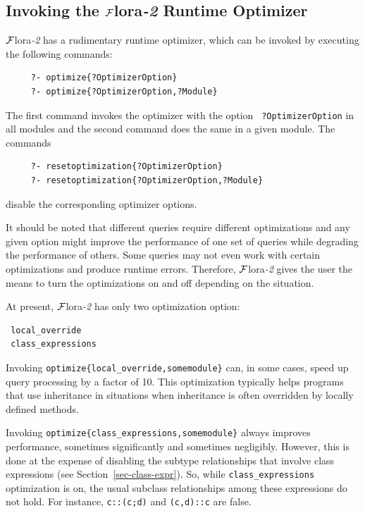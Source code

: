 \documentclass[11pt]{article}
\newcommand{\FLSYSTEM}{{\mbox{\sc ${\cal F}${lora}\rm\emph{-2}}}\xspace}
\begin{document}
\subsection{Invoking the \FLSYSTEM Runtime Optimizer}
\label{sec-runtime-optimizer}

\FLSYSTEM has a rudimentary runtime optimizer, which can be invoked by
executing the following commands:
\begin{verbatim}
     ?- optimize{?OptimizerOption}
     ?- optimize{?OptimizerOption,?Module}
\end{verbatim}
The first command invokes the optimizer with the option {\tt
  ?OptimizerOption} in all modules and the second command does the same in a
given module. The commands
\begin{verbatim}
     ?- resetoptimization{?OptimizerOption}
     ?- resetoptimization{?OptimizerOption,?Module}
\end{verbatim}
disable the corresponding optimizer options.

It should be noted that different queries require different optimizations
and any given option might improve the performance of one set of queries
while degrading the performance of others.
Some queries may not even work with certain optimizations and produce
runtime errors.
Therefore, \FLSYSTEM gives the user
the means to turn the optimizations on and off depending on the situation.

At present, \FLSYSTEM has only two optimization option:
\begin{verbatim}
 local_override  
 class_expressions
\end{verbatim}
Invoking {\tt optimize\{local\_override,somemodule\}} can, in some cases,
speed up query processing by a factor of 10. This optimization typically
helps programs that use inheritance in situations
when inheritance is often overridden by locally defined methods.

Invoking {\tt optimize\{class\_expressions,somemodule\}} always improves
performance, sometimes significantly and sometimes negligibly.
However, this is done at the expense of disabling the subtype relationships
that involve class expressions (see Section~\ref{sec-class-expr}).
So, while {\tt class\_expressions} optimization is on, the usual
subclass relationships among these expressions do not hold. For instance,
{\tt c::(c;d)} and {\tt (c,d)::c} are false.
\end{document}
